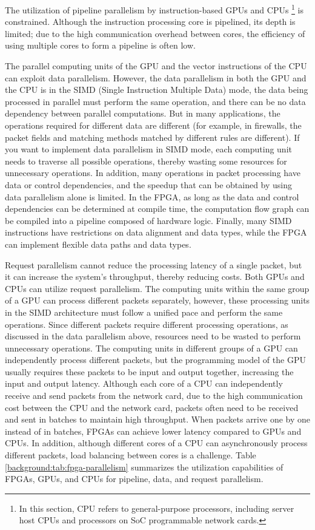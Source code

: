 The utilization of pipeline parallelism by instruction-based GPUs and CPUs \footnote{In this section, CPU refers to general-purpose processors, including server host CPUs and processors on SoC programmable network cards.} is constrained. Although the instruction processing core is pipelined, its depth is limited; due to the high communication overhead between cores, the efficiency of using multiple cores to form a pipeline is often low.

The parallel computing units of the GPU and the vector instructions of the CPU can exploit data parallelism. However, the data parallelism in both the GPU and the CPU is in the SIMD (Single Instruction Multiple Data) mode, the data being processed in parallel must perform the same operation, and there can be no data dependency between parallel computations. But in many applications, the operations required for different data are different (for example, in firewalls, the packet fields and matching methods matched by different rules are different). If you want to implement data parallelism in SIMD mode, each computing unit needs to traverse all possible operations, thereby wasting some resources for unnecessary operations.
In addition, many operations in packet processing have data or control dependencies, and the speedup that can be obtained by using data parallelism alone is limited. In the FPGA, as long as the data and control dependencies can be determined at compile time, the computation flow graph can be compiled into a pipeline composed of hardware logic.
Finally, many SIMD instructions have restrictions on data alignment and data types, while the FPGA can implement flexible data paths and data types.

Request parallelism cannot reduce the processing latency of a single packet, but it can increase the system's throughput, thereby reducing costs. Both GPUs and CPUs can utilize request parallelism. The computing units within the same group of a GPU can process different packets separately, however, these processing units in the SIMD architecture must follow a unified pace and perform the same operations. Since different packets require different processing operations, as discussed in the data parallelism above, resources need to be wasted to perform unnecessary operations. The computing units in different groups of a GPU can independently process different packets, but the programming model of the GPU usually requires these packets to be input and output together, increasing the input and output latency. Although each core of a CPU can independently receive and send packets from the network card, due to the high communication cost between the CPU and the network card, packets often need to be received and sent in batches to maintain high throughput. When packets arrive one by one instead of in batches, FPGAs can achieve lower latency compared to GPUs and CPUs. In addition, although different cores of a CPU can asynchronously process different packets, load balancing between cores is a challenge. Table \ref{background:tab:fpga-parallelism} summarizes the utilization capabilities of FPGAs, GPUs, and CPUs for pipeline, data, and request parallelism.

